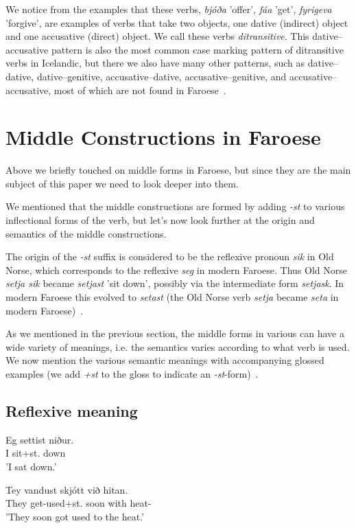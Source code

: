 \documentclass[12pt,%
]{lin-v2/lin}
\begin{document}
We notice from the examples that these verbs, \emph{bjóða} 'offer', \emph{fáa} 'get', \emph{fyrigeva} 'forgive', are
examples of verbs that take two objects, one dative (indirect) object and one accusative (direct) object. We call these verbs \emph{ditransitive}.
This dative--accusative pattern is also the most common case marking pattern of ditransitive verbs in Icelandic, but there
we also have many other patterns, such as dative--dative, dative--genitive, accusative--dative, accusative--genitive, and
accusative--accusative, most of which are not found in Faroese~\citep[262-263]{faroese}.


\section{Middle Constructions in Faroese}

Above we briefly touched on middle forms in Faroese, but since they are the main subject of this paper we need to look deeper into them.

We mentioned that the middle constructions are formed by adding \emph{-st} to various inflectional forms of the verb,
but let's now look further at the origin and semantics of the middle constructions.

The origin of the \emph{-st} suffix is considered to be the reflexive pronoun \emph{sik} in Old Norse,
which corresponds to the reflexive \emph{seg} in modern Faroese. Thus Old Norse \emph{setja sik} became
\emph{setjast} 'sit down', possibly via the intermediate form \emph{setjask}.
In modern Faroese this evolved to \emph{setast} (the Old Norse verb \emph{setja} became \emph{seta} in
modern Faroese)~\citep[277]{faroese}.

As we mentioned in the previous section, the middle forms in various can have a wide variety of meanings,
i.e. the semantics varies according to what verb is used. We now mention the various semantic
meanings with accompanying glossed examples (we add \emph{+st} to the gloss to 
indicate an \emph{-st}-form)~\citep[277-278]{faroese}.

\subsection*{Reflexive meaning}

\begin{exe}
    \ex
    \begin{xlist}
        \item \gll Eg settist niður.\\
        I sit+st.\Pst{} down\\
        \trans 'I sat down.'\\
        \item \gll Tey vandust skjótt við hitan.\\
        They {get-used}+st.\Pst{} soon with heat-\Def{}\\
        \trans 'They soon got used to the heat.'
    \end{xlist}
\end{exe}
\end{document}
